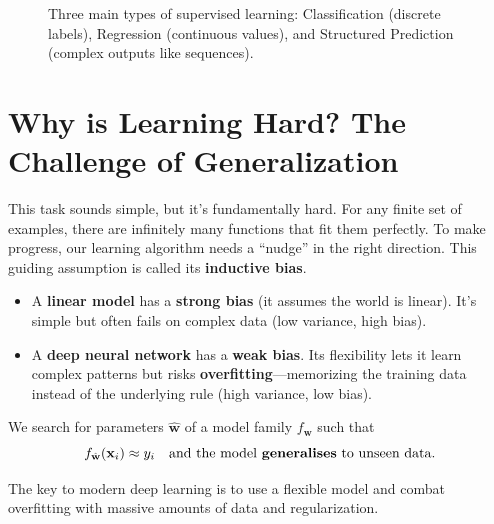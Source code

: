 \documentclass{article}
\newcommand{\w}{\mathbf{w}}
\newcommand{\x}{\mathbf{x}}
\begin{document}
\begin{figure}[h!]
\caption{Three main types of supervised learning: Classification (discrete labels), Regression (continuous values), and Structured Prediction (complex outputs like sequences).}
\end{figure}




\section{Why is Learning Hard? The Challenge of Generalization}

This task sounds simple, but it's fundamentally hard. For any finite set of examples, there are infinitely many functions that fit them perfectly. To make progress, our learning algorithm needs a ``nudge'' in the right direction. This guiding assumption is called its \textbf{inductive bias}.

\begin{itemize}
    \item A \textbf{linear model} has a \textbf{strong bias} (it assumes the world is linear). It's simple but often fails on complex data (low variance, high bias).
    \item A \textbf{deep neural network} has a \textbf{weak bias}. Its flexibility lets it learn complex patterns but risks \textbf{overfitting}---memorizing the training data instead of the underlying rule (high variance, low bias).
\end{itemize}

We search for parameters $\hat{\w}$ of a model family $f_\w$ such that
\[ f_{\hat{\w}}(\x_i) \approx y_i \quad \text{and the model \textbf{generalises} to unseen data.} \]

The key to modern deep learning is to use a flexible model and combat overfitting with massive amounts of data and regularization.
\end{document}
